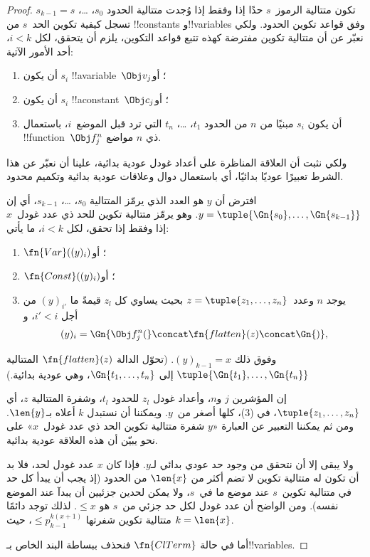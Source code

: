 \documentclass[../../../include/open-logic-section]{subfiles}
\begin{document}
\begin{proof}
تكون متتالية الرموز~$s$ حدًا إذا وفقط إذا وُجدت متتالية الحدود
$s_0$، \dots، $s_{k-1}=s$ تسجل كيفية تكوين الحد~$s$ من
!!{constant}s و!!{variable}s وفق قواعد تكوين الحدود. ولكي نعبّر عن أن
متتالية تكوين مفترضة كهذه تتبع قواعد التكوين، يلزم أن يتحقق، لكل
$i<k$، أحد الأمور الآتية:
\begin{enumerate}
\item أن يكون $s_i$ !!a{variable}~$\Obj v_j$؛ أو
\item أن يكون $s_i$ !!a{constant}~$\Obj c_j$؛ أو
\item أن يكون $s_i$ مبنيًا من $n$ من الحدود $t_1$، \dots، $t_n$ التي
  ترد قبل الموضع~$i$، باستعمال !!{function}~$\Obj f^n_j$ ذي $n$ مواضع.
\end{enumerate}
ولكي نثبت أن العلاقة المناظرة على أعداد غودل عودية بدائية، علينا أن
نعبّر عن هذا الشرط تعبيرًا عوديًا بدائيًا، أي باستعمال دوال وعلاقات
عودية بدائية وتكميم محدود.

افترض أن $y$ هو العدد الذي يرمّز المتتالية $s_0$، \dots، $s_{k-1}$،
أي إن $y=\tuple{\Gn{s_0}, \dots, \Gn{s_{k-1}}}$. وهو يرمّز متتالية
تكوين للحد ذي عدد غودل~$x$ إذا وفقط إذا تحقق، لكل $i<k$، ما يأتي:
\begin{enumerate}
\item $\fn{Var}((y)_i)$؛ أو
\item $\fn{Const}((y)_i)$؛ أو
\item يوجد $n$ وعدد~$z=\tuple{z_1, \dots, z_n}$ بحيث يساوي كل $z_l$
  قيمةً ما $(y)_{i'}$ من أجل $i'<i$، و
\[
(y)_i = \Gn{\Obj f^n_j(} \concat \fn{flatten}(z) \concat \Gn{)},
\]
\end{enumerate}
وفوق ذلك $(y)_{k-1}=x$. (تحوّل الدالة $\fn{flatten}(z)$ المتتالية
$\tuple{\Gn{t_1}, \dots, \Gn{t_n}}$ إلى $\Gn{t_1, \dots, t_n}$، وهي
عودية بدائية.)

إن المؤشرين $j$ و$n$، وأعداد غودل $z_l$ للحدود $t_l$، وشفرة المتتالية
$z$، أي $\tuple{z_1, \dots, z_n}$، في (3)، كلها أصغر من~$y$. ويمكننا
أن نستبدل $k$ أعلاه بـ$\len{y}$. ومن ثم يمكننا التعبير عن العبارة
«$y$ شفرة متتالية تكوين الحد ذي عدد غودل~$x$» على نحو يبيّن أن هذه
العلاقة عودية بدائية.

ولا يبقى إلا أن نتحقق من وجود حد عودي بدائي لـ$y$. فإذا كان $x$ عدد
غودل لحد، فلا بد أن تكون له متتالية تكوين لا تضم أكثر من $\len{x}$ من
الحدود (إذ يجب أن يبدأ كل حد في متتالية تكوين~$s$ عند موضع ما في~$s$،
ولا يمكن لحدين جزئيين أن يبدآ عند الموضع نفسه). ومن الواضح أن عدد غودل
لكل حد جزئي من~$s$ هو $\le x$. لذلك توجد دائمًا متتالية تكوين شفرتها
$\le p_{k-1}^{k(x+1)}$، حيث $k=\len{x}$.

أما في حالة $\fn{ClTerm}$ فنحذف ببساطة البند الخاص بـ!!{variable}s.
\end{proof}
\end{document}
